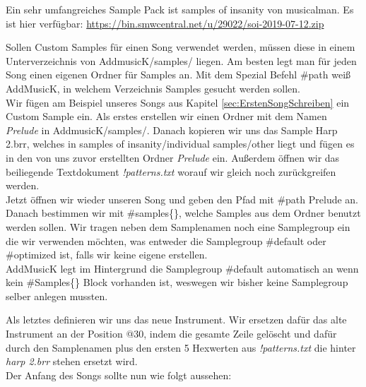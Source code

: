 \medskip

Ein sehr umfangreiches Sample Pack ist samples of insanity von musicalman. Es ist hier verfügbar:
\href{https://bin.smwcentral.net/u/29022/soi-2019-07-12.zip}{https://bin.smwcentral.net/u/29022/soi-2019-07-12.zip}

\bigskip

Sollen Custom Samples für einen Song verwendet werden, müssen diese in einem Unterverzeichnis von AddmusicK/samples/ liegen. Am besten legt man für jeden Song einen eigenen Ordner für Samples an. Mit dem Spezial Befehl \#path weiß AddMusicK, in welchem Verzeichnis Samples gesucht werden sollen. \\
Wir fügen am Beispiel unseres Songs aus Kapitel \ref{sec:ErstenSongSchreiben} ein Custom Sample ein. Als erstes erstellen wir einen Ordner mit dem Namen \textit{Prelude} in AddmusicK/samples/. Danach kopieren wir uns das Sample Harp 2.brr, welches in samples of insanity/individual samples/other liegt und fügen es in den von uns zuvor erstellten Ordner \textit{Prelude} ein. Außerdem öffnen wir das beiliegende Textdokument \textit{!patterns.txt} worauf wir gleich noch zurückgreifen werden. \\
Jetzt öffnen wir wieder unseren Song und geben den Pfad mit \#path  \dq Prelude\dq{} an. Danach bestimmen wir mit \#samples\{\}, welche Samples aus dem Ordner benutzt werden sollen. Wir tragen neben dem Samplenamen noch eine Samplegroup ein die wir verwenden möchten, was entweder die Samplegroup \#default oder \#optimized ist, falls wir keine eigene erstellen. \\
AddMusicK legt im Hintergrund die Samplegroup \#default automatisch an wenn kein \#Samples\{\} Block vorhanden ist, weswegen wir bisher keine Samplegroup selber anlegen mussten.


\medskip



\medskip

Als letztes definieren wir uns das neue Instrument. Wir ersetzen dafür das alte Instrument an der Position @30, indem  die gesamte Zeile gelöscht und dafür durch den Samplenamen plus den ersten 5 Hexwerten aus  \textit{!patterns.txt} die hinter  \textit{harp 2.brr} stehen ersetzt wird. \\
Der Anfang des Songs sollte nun wie folgt aussehen:

\medskip

